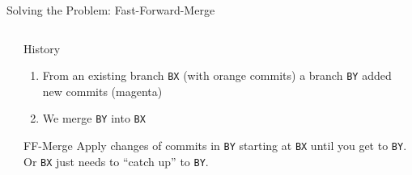 \documentclass[xetex, handout]{beamer}
\begin{document}
\begin{frame}[fragile]{Solving the Problem: Fast-Forward-Merge}
\begin{columns}
\begin{column}{.5\linewidth}
    \end{column}
    \begin{column}{.5\linewidth}
      \begin{exampleblock}{History}
        \begin{enumerate}
          \item From an existing branch \texttt{BX} (with orange commits) a
            branch \texttt{BY} added new commits (magenta)
          \item We merge \texttt{BY} into \texttt{BX}
        \end{enumerate}
      \end{exampleblock}
      \begin{alertblock}{FF-Merge}
        Apply changes of commits in \texttt{BY} starting at \texttt{BX} until
        you get to \texttt{BY}. Or \texttt{BX} just needs to ``catch up'' to
        \texttt{BY}.
      \end{alertblock}
    \end{column}
  \end{columns}
\end{frame}
\end{document}
